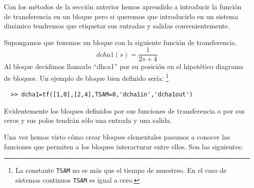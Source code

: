 Con los métodos de la sección anterior hemos aprendido a introducir la
función de transferencia en un bloque pero si queremos que
introducirlo en un sistema dinámico tendremos que etiquetar sus
entradas y salidas convenientemente.

Supongamos que tenemos un bloque con la siguiente función de
transferencia.
$$dcha1(s)=\frac{1}{2s+4}$$ Al bloque decidimos llamarlo {}``dhca1'' por
su posición en el hipotético diagrama de bloques. Un ejemplo de bloque
bien definido sería: %
\footnote{La constante \texttt{TSAM} no es más que el tiempo de
  muestreo. En el caso de sistemas continuos \texttt{TSAM} es igual a
  cero.%
}

\begin{verbatim}
  >> dcha1=tf([1,0],[2,4],TSAM=0,'dcha1in','dcha1out')
\end{verbatim}
Evidentemente los bloques definidos por sus funciones de transferencia
o por sus ceros y sus polos tendrán sólo una entrada y una salida.

Una vez hemos visto cómo crear bloques elementales pasamos a conocer
las funciones que permiten a los bloques interacturar entre ellos.
Son las siguientes:

